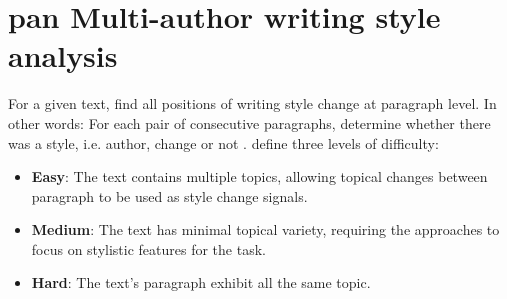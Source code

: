 \section{\acs{pan} Multi-author writing style analysis}
\label{sec:pan_multi_author_writing_style_analysis}

For a given text, find all positions of writing style change at paragraph level.
In other words: For each pair of consecutive paragraphs, 
determine whether there was a style, i.e. author, change or not \cite{zangerle_overview_2024,ayele_overview_2024}.
\citet{zangerle_overview_2024} define three levels of difficulty:
\begin{itemize}
    \item \textbf{Easy}: The text contains multiple topics, 
    allowing topical changes between paragraph to be used as style change signals.
    \item \textbf{Medium}: The text has minimal topical variety, 
    requiring the approaches to focus on stylistic features for the task.
    \item \textbf{Hard}: The text's paragraph exhibit all the same topic.
\end{itemize}